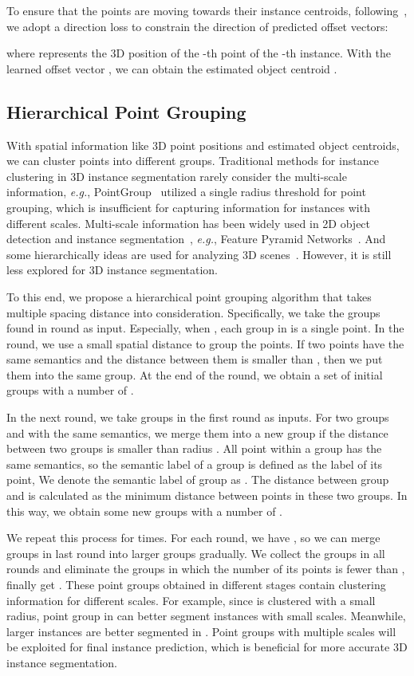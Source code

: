 \documentclass{article}
\newcommand{\eg}{\emph{e.g.}}
\begin{document}
To ensure that the points are moving towards their instance centroids, following~\cite{mtml}, we adopt a direction loss  to constrain the direction of predicted offset vectors:

where  represents the 3D position of the -th point of the -th instance. 
With the learned offset vector , we can obtain the estimated object centroid .

\subsection{Hierarchical Point Grouping}


With spatial information like 3D point positions and estimated object centroids, we can cluster points into different groups.
Traditional methods for instance clustering in 3D instance segmentation rarely consider the multi-scale information, \eg, PointGroup~\cite{pointgroup} utilized a single radius threshold for point grouping, which is insufficient for capturing information for instances with different scales. Multi-scale information has been widely used in 2D object detection and instance segmentation~\cite{fpn,chen2021empirical}, \eg, Feature Pyramid Networks~\cite{fpn}. 
And some hierarchically ideas are used for analyzing 3D scenes~\cite{DBLP:conf/iccv/ArmeniHZGMFS19, DBLP:conf/cvpr/ShiCWS019}.
However, it is still less explored for 3D instance segmentation.

To this end, we propose a hierarchical point grouping algorithm that takes multiple spacing distance into consideration.
Specifically, we take the groups  found in  round as input. 
Especially, when , each group in  is a single point.
In the  round, we use a small spatial distance  to group the points.
If two points have the same semantics and the distance between them is smaller than , then we put them into the same group.
At the end of the  round, we obtain a set of initial groups  with a number of .

In the next round, we take groups  in the first round as inputs.
For two groups  and  with the same semantics, we merge them into a new group if the distance between two groups is smaller than radius . 
All point within a group has the same semantics, so the semantic label of a group  is defined as the label of its point,
We denote the semantic label of group  as .
The distance   between group  and  is calculated as the minimum distance between points in these two groups.
In this way, we obtain some new groups   with a number of .

We repeat this process for  times. For each round, we have , so we can merge groups in last round into larger groups gradually. 
We collect the groups in all rounds and eliminate the groups in which the number of its points is fewer than , 
finally get  .
These point groups obtained in different stages contain clustering information for different scales. For example, since  is clustered with a small radius, point group in  can better segment instances with small scales. 
Meanwhile, larger instances are better segmented in . Point groups with multiple scales  will be exploited for final instance prediction, which is beneficial for more accurate 3D instance segmentation.
\end{document}
